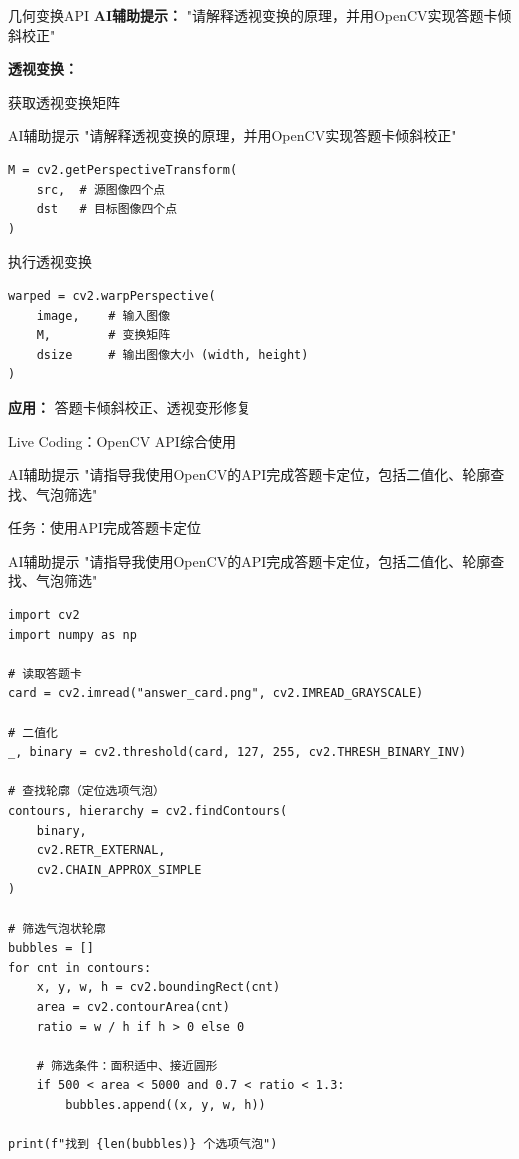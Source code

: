 \begin{frame}{几何变换API}
    \textbf{AI辅助提示：}
    \aihint{} "请解释透视变换的原理，并用OpenCV实现答题卡倾斜校正"

    \textbf{透视变换：}

    \begin{block}{获取透视变换矩阵}
    \begin{block}{AI辅助提示}
        \aihint{} "请解释透视变换的原理，并用OpenCV实现答题卡倾斜校正"
    \end{block}

    \begin{lstlisting}
M = cv2.getPerspectiveTransform(
    src,  # 源图像四个点
    dst   # 目标图像四个点
)
    \end{lstlisting}
    \end{block}

    \begin{block}{执行透视变换}
    \begin{lstlisting}
warped = cv2.warpPerspective(
    image,    # 输入图像
    M,        # 变换矩阵
    dsize     # 输出图像大小 (width, height)
)
    \end{lstlisting}
    \end{block}

    \textbf{应用：} 答题卡倾斜校正、透视变形修复
\end{frame}

\begin{frame}[fragile]{Live Coding：OpenCV API综合使用}
    \begin{block}{AI辅助提示}
        \aihint{} "请指导我使用OpenCV的API完成答题卡定位，包括二值化、轮廓查找、气泡筛选"
    \end{block}

    \begin{block}{任务：使用API完成答题卡定位}
    \begin{block}{AI辅助提示}
        \aihint{} "请指导我使用OpenCV的API完成答题卡定位，包括二值化、轮廓查找、气泡筛选"
    \end{block}

    \begin{lstlisting}[basicstyle=\ttfamily\scriptsize]
import cv2
import numpy as np

# 读取答题卡
card = cv2.imread("answer_card.png", cv2.IMREAD_GRAYSCALE)

# 二值化
_, binary = cv2.threshold(card, 127, 255, cv2.THRESH_BINARY_INV)

# 查找轮廓（定位选项气泡）
contours, hierarchy = cv2.findContours(
    binary,
    cv2.RETR_EXTERNAL,
    cv2.CHAIN_APPROX_SIMPLE
)

# 筛选气泡状轮廓
bubbles = []
for cnt in contours:
    x, y, w, h = cv2.boundingRect(cnt)
    area = cv2.contourArea(cnt)
    ratio = w / h if h > 0 else 0

    # 筛选条件：面积适中、接近圆形
    if 500 < area < 5000 and 0.7 < ratio < 1.3:
        bubbles.append((x, y, w, h))

print(f"找到 {len(bubbles)} 个选项气泡")
    \end{lstlisting}
    \end{block}
\end{frame}
